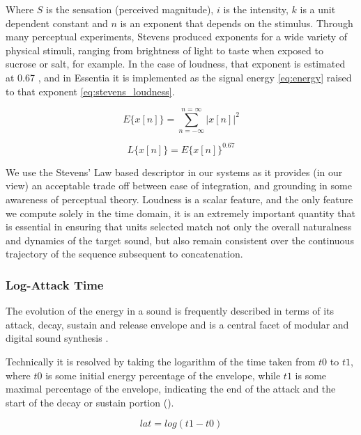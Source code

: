 {{Where $S$ is the sensation (perceived magnitude), $i$ is the intensity, $k$ is a unit dependent constant and $n$ is an exponent that depends on the stimulus. Through many perceptual experiments, Stevens produced exponents for a wide variety of physical stimuli, ranging from brightness of light to taste when exposed to sucrose or salt, for example. In the case of loudness, that exponent is estimated at 0.67 \citep{Stevens1975}, and in Essentia it is implemented as the signal energy \eqref{eq:energy} raised to that exponent \eqref{eq:stevens_loudness}.

\begin{equation}
\label{eq:energy}
E\{x[n]\}= \sum_{n=-\infty}^{n=\infty}|x[n]|^{2}
\end{equation}

\begin{equation}
\label{eq:stevens_loudness}
L\{x[n]\}= E\{x[n]\}^{0.67}
\end{equation}

We use the Stevens' Law based descriptor in our systems as it provides (in our view) an acceptable trade off between ease of integration, and grounding in some awareness of perceptual theory. Loudness is a scalar feature, and the only feature we compute solely in the time domain, it is an extremely important quantity that is essential in ensuring that units selected match not only the overall naturalness and dynamics of the target sound, but also remain consistent over the continuous trajectory of the sequence subsequent to concatenation. 

\subsubsection{Log-Attack Time}

The evolution of the energy in a sound is frequently described in terms of its attack, decay, sustain and release envelope \citep{Peeters2004b, Kim2006, Brossier2004a} and is a central facet of modular and digital sound synthesis \citep{Russ2004}. 

Technically it is resolved by taking the logarithm of the time taken from $t0$ to $t1$, where $t0$ is some initial energy percentage of the envelope, while $t1$ is some maximal percentage of the envelope, indicating the end of the attack and the start of the decay or sustain portion ().

\begin{equation}
\label{eq:lat}
lat = log(t1-t0)
\end{equation}

}}
